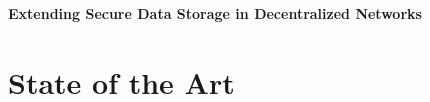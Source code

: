 \documentclass{article}
\begin{document}


{\huge  \textbf {Extending Secure Data Storage in Decentralized Networks}}\\
\section{State of the Art}
\end{document}

